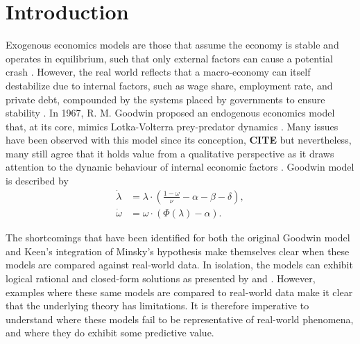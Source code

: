 \documentclass[12pt, centerh1]{article}
\begin{document}
\section{Introduction}
\noindent Exogenous economics models are those that assume the economy is stable and operates in equilibrium, such that only external factors can cause a potential crash \citep{ganti_2019}. However, the real world reflects that a macro-economy can itself destabilize due to internal factors, such as wage share, employment rate, and private debt, compounded by the systems placed by governments to ensure stability \citep{minsky1992financial}. In 1967, R. M. Goodwin proposed an endogenous economics model that, at its core, mimics Lotka-Volterra prey-predator dynamics \citep{goodwin1982growth}. Many issues have been observed with this model since its conception, \color{red}\textbf{CITE}\color{black} but nevertheless, many still agree that it holds value from a qualitative perspective as it draws attention to the dynamic behaviour of internal economic factors \citep{flaschel2016mathematical}. Goodwin model is described by
\begin{equation}\label{eq:goodwin} 
\begin{split}
    \dot{\lambda} &= \lambda \cdot \left( \frac{1-\omega}{\nu} - \alpha - \beta - \delta \right), \\
    \dot{\omega} &= \omega \cdot (\Phi(\lambda) - \alpha).
\end{split}
\end{equation}


\noindent The shortcomings that have been identified for both the original Goodwin model and Keen’s integration of Minsky’s hypothesis make themselves clear when these models are compared against real-world data. In isolation, the models can exhibit logical rational and closed-form solutions as presented by \citet{goodwin1982growth} and \citet{grasselli2012analysis}. However, examples where these same models are compared to real-world data \citep{harvie2000testing, moura2013testing} make it clear that the underlying theory has limitations. It is therefore imperative to understand where these models fail to be representative of real-world phenomena, and where they do exhibit some predictive value. 
\end{document}
